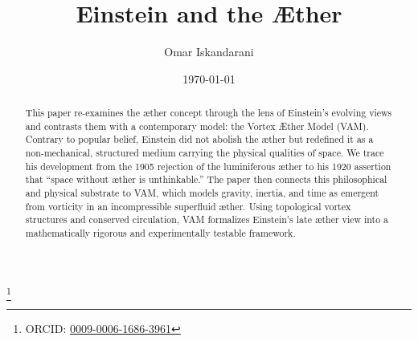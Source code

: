 \documentclass[a4paper,12pt]{revtex4}
\begin{document}
    \date{\today}
    \author{Omar Iskandarani}
    \title{Einstein and the Æther}
    \thanks{ORCID: \href{https://orcid.org/0009-0006-1686-3961}{0009-0006-1686-3961}}

    \begin{abstract}
    This paper re-examines the æther concept through the lens of Einstein’s evolving views and contrasts them with a contemporary model: the Vortex Æther Model (VAM). Contrary to popular belief, Einstein did not abolish the æther but redefined it as a non-mechanical, structured medium carrying the physical qualities of space. We trace his development from the 1905 rejection of the luminiferous æther to his 1920 assertion that “space without æther is unthinkable.” The paper then connects this philosophical and physical substrate to VAM, which models gravity, inertia, and time as emergent from vorticity in an incompressible superfluid æther. Using topological vortex structures and conserved circulation, VAM formalizes Einstein’s late æther view into a mathematically rigorous and experimentally testable framework.
    \end{abstract}

    \maketitle

    
    
    

    \appendix \label{sec:Appendix}
        
        
        

    
    
\end{document}
